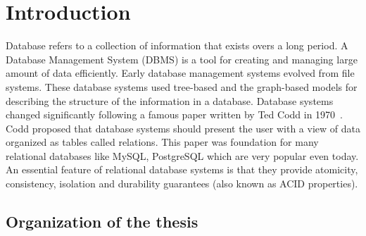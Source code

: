 \chapter{Introduction}
\label{chap:intro}

Database refers to a collection of information that exists overs a long period. A Database Management System (DBMS) is a tool for creating and managing large amount of data efficiently. Early database management systems evolved from file systems. These database systems used tree-based and the graph-based models for describing the structure of the information in a database.
Database systems changed significantly following a famous paper written by Ted Codd in 1970~\cite{codd1970relational}. Codd proposed that database systems should present the user with a view of data organized as tables called relations. This paper was foundation for many relational databases like MySQL, PostgreSQL which are very popular even today.
An essential feature of relational database systems is that they provide atomicity, consistency, isolation and durability guarantees (also known as ACID properties).

\section{Organization of the thesis}
